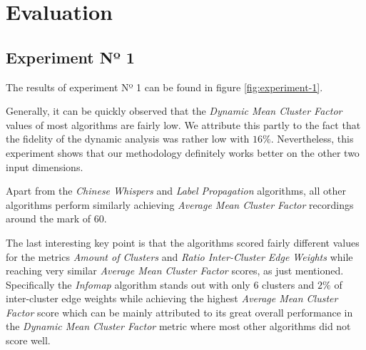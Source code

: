 \documentclass[12pt,a4paper]{report}
\begin{document}
\chapter{Evaluation} \label{chap:evaluation}

\section{Experiment Nº 1}

The results of experiment Nº 1 can be found in figure \ref{fig:experiment-1}.

Generally, it can be quickly observed that the \textit{Dynamic Mean Cluster Factor}
values of most algorithms are fairly low.
We attribute this partly to the fact that the fidelity of the dynamic analysis
was rather low with $16\%$. Nevertheless, this experiment shows that our methodology
definitely works better on the other two input dimensions.

Apart from the \textit{Chinese Whispers} and \textit{Label Propagation} algorithms,
all other algorithms perform similarly achieving \textit{Average Mean Cluster Factor}
recordings around the mark of $60$.

The last interesting key point is that the algorithms scored fairly different
values for the metrics \textit{Amount of Clusters} and
\textit{Ratio Inter-Cluster Edge Weights} while reaching very similar
\textit{Average Mean Cluster Factor} scores, as just mentioned.
Specifically the \textit{Infomap} algorithm stands out with only $6$ clusters
and $2 \%$ of inter-cluster edge weights while achieving the highest
\textit{Average Mean Cluster Factor} score which can be mainly attributed to
its great overall performance in the \textit{Dynamic Mean Cluster Factor} metric
where most other algorithms did not score well.
\end{document}

